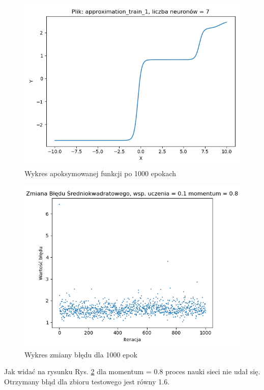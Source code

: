 \documentclass[12pt]{article}
\begin{document}
\begin{figure}[!htb]
 \centering
 \includegraphics[width=12cm]{FunctionPlot7Neuronmomentum08.png}
 \caption{Wykres apoksymowanej funkcji po 1000 epokach}
 \vspace{-0.3cm}
 \label{WykresFun8}
\end{figure}



\begin{figure}[!htb]
 \centering
 \includegraphics[width=12cm]{ZmianaBledu7Neuronmomentum08.png}
 \vspace{-0.3cm}
 \caption{Wykres zmiany błędu dla 1000 epok}
 \label{WykresBlad8}
\end{figure}
\newpage
Jak widać na rysunku Rys. \ref{WykresBlad8} dla momentum = 0.8 proces nauki sieci nie udał się. Otrzymany błąd dla zbioru testowego jest równy 1.6.
\end{document}
